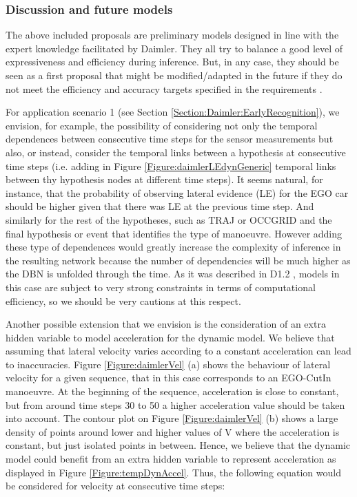 \subsubsection{Discussion and future models}
The above included proposals are preliminary models designed in line with the expert knowledge facilitated by Daimler. They all try to balance a good level of expressiveness and efficiency during inference.  But, in any case, they should be seen as a first proposal that might be modified/adapted in the future if they do not meet the efficiency and accuracy targets specified in the requirements \cite{Fer14}. 

For application scenario 1 (see Section \ref{Section:Daimler:EarlyRecognition}),  we envision, for example, the possibility of considering not only the temporal dependences between consecutive time steps for the sensor measurements but also, or instead, consider the temporal links between a hypothesis at consecutive time steps (i.e. adding in Figure \ref{Figure:daimlerLEdynGeneric} temporal links between thy hypothesis nodes at different time steps). It seems natural, for instance, that the probability of observing lateral evidence (LE) for the EGO car should be higher given that there was LE at the previous time step. And similarly for the rest of the hypotheses, such as TRAJ or OCCGRID  and the final hypothesis or event that identifies the type of manoeuvre. However adding these type of dependences would greatly increase the complexity of inference in the resulting network because the number of dependencies will be much higher as the DBN is unfolded through the time. As it was described in D1.2 \cite{Fer14}, models in this case are subject to very strong constraints in terms of computational efficiency, so we should be very cautions at this respect. 

Another possible extension that we envision is the consideration of an extra hidden variable to model acceleration for the dynamic model. We believe that assuming that lateral velocity varies according to a constant acceleration can lead to inaccuracies. Figure \ref{Figure:daimlerVel} (a) shows the behaviour of lateral velocity for a given sequence, that in this case corresponds to an EGO-CutIn manoeuvre. At the beginning of the sequence, acceleration is close to constant, but from around time steps 30 to 50 a higher acceleration value should be taken into account. The contour plot on Figure \ref{Figure:daimlerVel} (b) shows a large density of points around lower and higher values of V where the acceleration is constant, but just isolated points in between. Hence, we believe that the dynamic model could benefit from an extra hidden variable to represent acceleration as displayed in Figure \ref{Figure:tempDynAccel}. %
Thus, the following equation would be considered for velocity at consecutive time steps:

